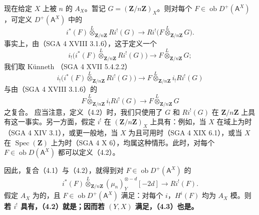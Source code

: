 现在给定 $X$ 上被 $n$ 的 $A_X$。暂记 $G=(\mathbf Z/n\mathbf Z)_X$。则对每个 $F\in\operatorname{ob}D^+(\mathsf A^X)$，可定义 $D^+(\mathsf A^X)$ 中的
\[
i^*(F)\mathbin{\mathop\otimes\limits^L}_{\mathbf Z/n\mathbf Z}Ri^!(G)
\longrightarrow Ri^!\bigl(F\mathbin{\mathop\otimes\limits^L}_{\mathbf Z/n\mathbf Z}G\bigr).
\tag{4.2}
\]
事实上，由（SGA 4 XVIII 3.1.6），这于定义一个
\[
i_!\bigl(i^*(F)\mathbin{\mathop\otimes\limits^L}_{\mathbf Z/n\mathbf Z}Ri^!(G)\bigr)
\longrightarrow F\mathbin{\mathop\otimes\limits^L}_{\mathbf Z/n\mathbf Z}G;
\]
我们取 Künneth （SGA 4 XVII 5.4.2.2）
\[
i_!\bigl(i^*(F)\mathbin{\mathop\otimes\limits^L}_{\mathbf Z/n\mathbf Z}Ri^!(G)\bigr)
\longrightarrow F\mathbin{\mathop\otimes\limits^L}_{\mathbf Z/n\mathbf Z}i_!Ri^!(G)
\]
与由（SGA 4 XVIII 3.1.6）的
\[
F\mathbin{\mathop\otimes\limits^L}_{\mathbf Z/n\mathbf Z}i_!Ri^!(G)
\longrightarrow F\mathbin{\mathop\otimes\limits^L}_{\mathbf Z/n\mathbf Z}G
\]
之复合。
应当注意，定义（4.2）时，我们只使用了 $G$ 和 $Ri^!(G)$ 在 $\mathbf Z/n\mathbf Z$ 上具有这一事实。另一方面，假定 $i^!$ 在 $(\mathbf Z/n\mathbf Z)_X$ 上具有：例如，当 $X$ 在域上为时（SGA 4 XIV 3.1），或更一般地，当 $X$ 为且可用时（SGA 4 XIX 6.1），或当 $X$ 在 $\operatorname{Spec}(\mathbf Z)$ 上为时（SGA 4 X 6），均属这种情形。此时，对每个 $F\in\operatorname{ob}D(\mathsf A^X)$ 都可以定义（4.2）。

因此，复合（4.1）与（4.2），就得到对 $F\in\operatorname{ob}D^+(\mathsf A^X)$ 的
\[
i^*(F)\mathbin{\mathop\otimes\limits^L}_{\mathbf Z/n\mathbf Z}(\mu_n)_Y^{\otimes-d}[-2d]
\longrightarrow Ri^!(F).
\tag{4.3}
\]
假定 $A_X$ 为的，且 $F\in\operatorname{ob}D^+(\mathsf A^X)$ 满足：对每个 $i$，$H^i(F)$ 均为 $A_X$ 模。则\textbf{若 $i^!$ 具有，（4.2）就是；因而若 $(Y,X)$ 满足，（4.3）也是。}

